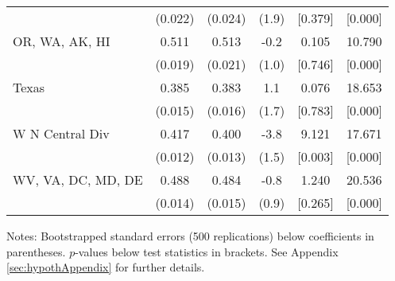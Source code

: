 \begin{landscape}
\begin{table}[ht]
{\begin{threeparttable}
\begin{tabular}{lccccc}
 & (0.022) & (0.024) & (1.9) & [0.379] & [0.000] \\ 
OR, WA, AK, HI & 0.511 & 0.513 & -0.2 & 0.105 & 10.790 \\ 
 & (0.019) & (0.021) & (1.0) & [0.746] & [0.000] \\ 
Texas & 0.385 & 0.383 & 1.1 & 0.076 & 18.653 \\ 
 & (0.015) & (0.016) & (1.7) & [0.783] & [0.000] \\ 
W N Central Div & 0.417 & 0.400 & -3.8 & 9.121 & 17.671 \\ 
 & (0.012) & (0.013) & (1.5) & [0.003] & [0.000] \\ 
WV, VA, DC, MD, DE & 0.488 & 0.484 & -0.8 & 1.240 & 20.536 \\ 
 & (0.014) & (0.015) & (0.9) & [0.265] & [0.000] \\ 
\bottomrule
\end{tabular}
{\footnotesize {\raggedright Notes: Bootstrapped standard errors (500 replications) below coefficients in parentheses. $p$-values below test statistics in brackets. See Appendix \ref{sec:hypothAppendix} for further details.}}
\end{threeparttable}
}
\end{table}
\end{landscape}
